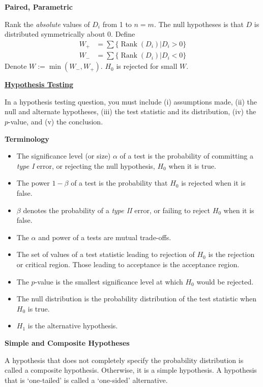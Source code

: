 \documentclass[a4paper]{article}
\newcommand{\heading}[1]{{\small\underline{\textbf{#1}}}\smallskip}
\newcommand{\subheading}[1]{{\scriptsize\textbf{#1}}}
\renewenvironment{section}[1]
  {
    \subheading{#1}\smallskip

  }{
    \medskip
  }
\DeclareMathOperator{\Rank}{Rank}
\begin{document}
\begin{multicols*}{4}
\begin{section}{Paired, Parametric}
  Rank the \textit{absolute} values of $D_i$ from 1 to $n=m$. The null
  hypotheses is that $D$ is distributed symmetrically about 0. Define
  \begin{align*}
    W_+ &= \sum \{\Rank(D_i) | D_i > 0 \} \\
    W_- &= \sum \{\Rank(D_i) | D_i < 0 \}
  \end{align*}
  Denote $W := \min(W_-, W_+)$. $H_0$ is rejected for small $W$.
\end{section}

\heading{Hypothesis Testing}

In a hypothesis testing question, you must include (i) assumptions made, (ii)
the null and alternate hypotheses, (iii) the test statistic and its
distribution, (iv) the $p$-value, and (v) the conclusion. \smallskip

\begin{section}{Terminology}
  \begin{itemize}
    \item The significance level (or size) $\alpha$ of a test is the probability
      of committing a \textit{type I} error, or rejecting the null hypothesis,
      $H_0$ when it is true.
    \item The power $1-\beta$ of a test is the probability that $H_0$ is
      rejected when it is false.
    \item $\beta$ denotes the probability of a \textit{type II} error, or
      failing to reject $H_0$ when it is false.
    \item The $\alpha$ and power of a tests are mutual trade-offs.
    \item The set of values of a test statistic leading to rejection of $H_0$ is
      the rejection or critical region. Those leading to acceptance is the
      acceptance region.
    \item The $p$-value is the smallest significance level at which $H_0$ would
      be rejected.
    \item The null distribution is the probability distribution of the test
      statistic when $H_0$ is true.
    \item $H_1$ is the alternative hypothesis.
  \end{itemize}
\end{section}

\begin{section}{Simple and Composite Hypotheses}
  A hypothesis that does not completely specify the probability distribution is
  called a composite hypothesis. Otherwise, it is a simple hypothesis. A
  hypothesis that is `one-tailed' is called a `one-sided' alternative.
\end{section}


\end{multicols*}
\end{document}
